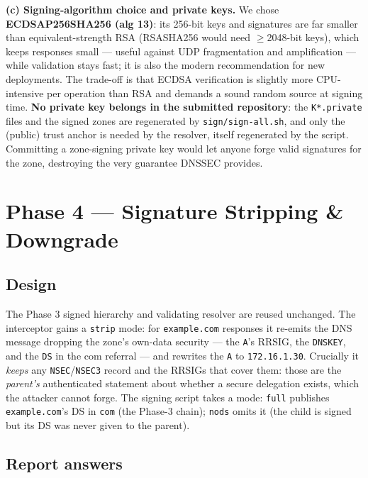 \documentclass[11pt,a4paper]{article}
\begin{document}
\textbf{(c) Signing-algorithm choice and private keys.} We chose \textbf{ECDSAP256SHA256
(alg 13)}: its 256-bit keys and signatures are far smaller than equivalent-strength RSA (RSASHA256
would need $\geq$2048-bit keys), which keeps responses small --- useful against UDP fragmentation
and amplification --- while validation stays fast; it is also the modern recommendation for new
deployments. The trade-off is that ECDSA verification is slightly more CPU-intensive per operation
than RSA and demands a sound random source at signing time. \textbf{No private key belongs in the
submitted repository}: the \texttt{K*.private} files and the signed zones are regenerated by
\texttt{sign/sign-all.sh}, and only the (public) trust anchor is needed by the resolver, itself
regenerated by the script. Committing a zone-signing private key would let anyone forge valid
signatures for the zone, destroying the very guarantee DNSSEC provides.


\section{Phase 4 --- Signature Stripping \& Downgrade}

\subsection{Design}
The Phase 3 signed hierarchy and validating resolver are reused unchanged. The interceptor gains a
\texttt{strip} mode: for \texttt{example.com} responses it re-emits the DNS message dropping the
zone's own-data security --- the \texttt{A}'s RRSIG, the \texttt{DNSKEY}, and the \texttt{DS} in the
com referral --- and rewrites the \texttt{A} to \texttt{172.16.1.30}. Crucially it \emph{keeps} any
\texttt{NSEC}/\texttt{NSEC3} record and the RRSIGs that cover them: those are the \emph{parent's}
authenticated statement about whether a secure delegation exists, which the attacker cannot forge.
The signing script takes a mode: \texttt{full} publishes \texttt{example.com}'s DS in \texttt{com}
(the Phase-3 chain); \texttt{nods} omits it (the child is signed but its DS was never given to the
parent).

\subsection{Report answers}
\end{document}
